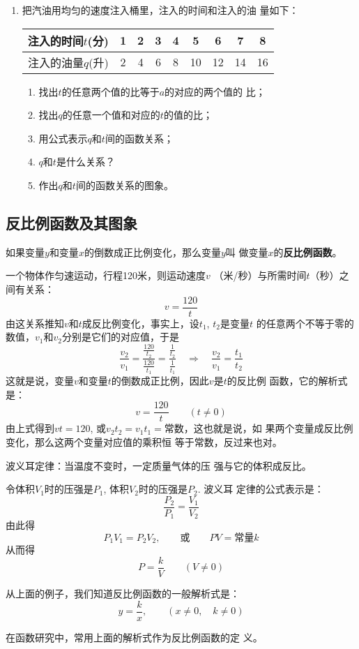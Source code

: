 \begin{enumerate}
\item 把汽油用均匀的速度注入桶里，注入的时间和注入的油
量如下：
\begin{center}
\begin{tabular}{c|cccccccc}
    \hline
    注入的时间$t$(分)&1&2&3&4&5&6&7&8\\
   \hline
注入的油量$q$(升)   &2&4&6&8&10&12&14&16\\
   \hline
\end{tabular}
\end{center}
\begin{enumerate}
    \item 找出$t$的任意两个值的比等于$a$的对应的两个值的
    比；
    \item 找出$q$的任意一个值和对应的$t$的值的比；
    \item 用公式表示$q$和$t$间的函数关系；
    \item $q$和$t$是什么关系？
    \item 作出$q$和$t$间的函数关系的图象。
\end{enumerate}
\end{enumerate}


\subsection{反比例函数及其图象}
如果变量$y$和变量$x$的倒数成正比例变化，那么变量$y$叫
做变量$x$的\textbf{反比例函数}。


\begin{example}
    一个物体作匀速运动，行程120米，则运动速度$v$
（米/秒）与所需时间$t$（秒）之间有关系：
\[v=\frac{120}{t}\]
由这关系推知$v$和$t$成反比例变化，事实上，设$t_1$, $t_2$是变量$t$
的任意两个不等于零的数值，$v_1$和$v_2$分别是它们的对应值，于是
\[\frac{v_2}{v_1}=\frac{\frac{120}{t_2}}{\frac{120}{t_1}}=\frac{\frac{1}{t_2}}{\frac{1}{t_1}}\quad \Rightarrow\quad \frac{v_2}{v_1}=\frac{t_1}{t_2}\]
这就是说，变量$v$和变量$t$的倒数成正比例，因此$v$是$t$的反比例
函数，它的解析式是：
\[v=\frac{120}{t}\qquad (t\ne 0)\]
由上式得到$vt=120$, 或$v_2t_2=v_1t_1=$常数，这也就是说，如
果两个变量成反比例变化，那么这两个变量对应值的乘积恒
等于常数，反过来也对。
\end{example}


\begin{example}
    波义耳定律：当温度不变时，一定质量气体的压
强与它的体积成反比。

令体积$V_1$时的压强是$P_1$, 体积$V_2$时的压强是$P_2$. 波义耳
定律的公式表示是：
\[\frac{P_2}{P_1}=\frac{V_1}{V_2}\]
由此得
\[P_1V_1=P_2V_2,\qquad \text{或}\qquad PV=\text{常量}k\]
从而得
\[P=\frac{k}{V}\qquad (V\ne 0)\]

从上面的例子，我们知道反比例函数的一般解析式是：
\[y=\frac{k}{x},\qquad (x\ne 0,\quad k\ne 0)\]

在函数研究中，常用上面的解析式作为反比例函数的定
义。
\end{example}

